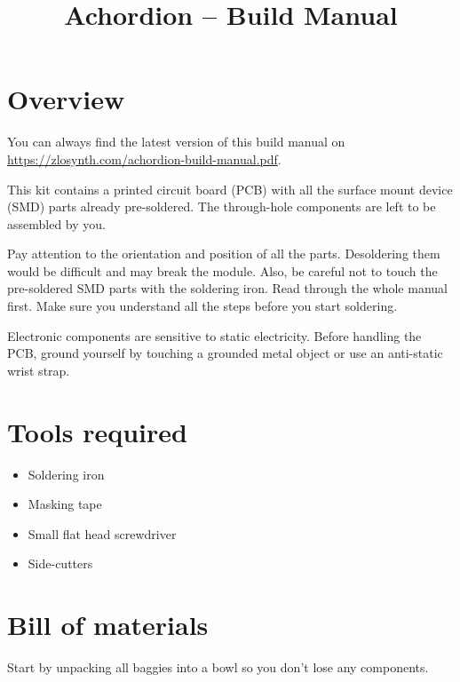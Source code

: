 \documentclass[10pt,a4paper,twocolumn]{article}
\begin{document}
\title{Achordion -- Build Manual}
\author{}
\date{}

\maketitle

\section{Overview}

You can always find the latest version of this build manual on \url{https://zlosynth.com/achordion-build-manual.pdf}.

This kit contains a printed circuit board (PCB) with all the surface mount device (SMD) parts already pre-soldered. The through-hole components are left to be assembled by you.

Pay attention to the orientation and position of all the parts. Desoldering them would be difficult and may break the module. Also, be careful not to touch the pre-soldered SMD parts with the soldering iron. Read through the whole manual first. Make sure you understand all the steps before you start soldering.

Electronic components are sensitive to static electricity. Before handling the PCB, ground yourself by touching a grounded metal object or use an anti-static wrist strap.

\newpage

\section{Tools required}

\begin{itemize}
  \item Soldering iron
  \item Masking tape
  \item Small flat head screwdriver
  \item Side-cutters
\end{itemize}

\newpage

\section{Bill of materials}

Start by unpacking all baggies into a bowl so you don't lose any components.
\end{document}
